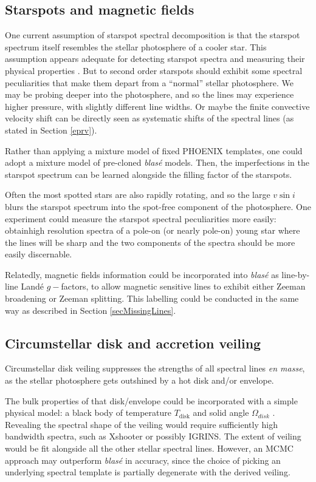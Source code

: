 \documentclass[trackchanges]{aastex631}
\begin{document}
\subsection{Starspots and magnetic fields}
One current assumption of starspot spectral decomposition is that the starspot spectrum itself resembles the stellar photosphere of a cooler star.  This assumption appears adequate for detecting starspot spectra and measuring their physical properties \citep{gullysantiago17}.  But to second order starspots should exhibit some spectral peculiarities that make them depart from a ``normal'' stellar photosphere.  We may be probing deeper into the photosphere, and so the lines may experience higher pressure, with slightly different line widths.  Or maybe the finite convective velocity shift can be directly seen as systematic shifts of the spectral lines (as stated in Section \ref{eprv}).

Rather than applying a mixture model of fixed PHOENIX templates, one could adopt a mixture model of pre-cloned  \emph{blas\'e} models.  Then, the imperfections in the starspot spectrum can be learned alongside the filling factor of the starspots.

Often the most spotted stars are also rapidly rotating, and so the large $v\sin{i}$ blurs the starspot spectrum into the spot-free component of the photosphere.  One experiment could measure the starspot spectral peculiarities more easily: obtainhigh resolution spectra of a pole-on (or nearly pole-on) young star where the lines will be sharp and the two components of the spectra should be more easily discernable.

Relatedly, magnetic fields information could be incorporated into  \emph{blas\'e} as line-by-line Land\'e $g-$factors, to allow magnetic sensitive lines to exhibit either Zeeman broadening or Zeeman splitting.  This labelling could be conducted in the same way as described in Section \ref{secMissingLines}.

\subsection{Circumstellar disk and accretion veiling}
Circumstellar disk veiling suppresses the strengths of all spectral lines \emph{en masse}, as the stellar photosphere gets outshined by a hot disk and/or envelope.

The bulk properties of that disk/envelope could be incorporated with a simple physical model: a black body of temperature $T_\mathrm{disk}$ and solid angle $\Omega_{disk}$ \citep{2018ApJ...862...85G}.  Revealing the spectral shape of the veiling would require sufficiently high bandwidth spectra, such as Xshooter \citep{2011A&A...536A.105V} or possibly IGRINS.  The extent of veiling would be fit alongside all the other stellar spectral lines.  However, an MCMC approach may outperform  \emph{blas\'e} in accuracy, since the choice of picking an underlying spectral template is partially degenerate with the derived veiling.
\end{document}
